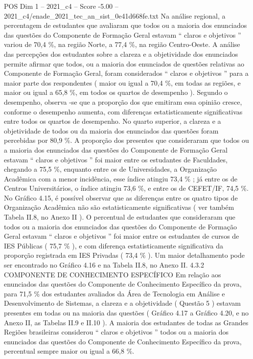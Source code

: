 \begin{textsample}{POS Dim 1 – 2021\_c4 – Score -5.00 – 2021\_c4/enade\_2021\_tec\_an\_sist\_0e41d668fe.txt}
Na análise regional, a percentagem de estudantes que avaliaram que todos ou a maioria dos enunciados das questões do Componente de Formação Geral estavam “ claros e objetivos ” variou de 70,4 \%, na região Norte, a 77,4 \%, na região Centro-Oeste.
A análise das percepções dos estudantes sobre a clareza e a objetividade dos enunciados permite afirmar que todos, ou a maioria dos enunciados de questões relativas ao Componente de Formação Geral, foram considerados “ claros e objetivos ” para a maior parte dos respondentes ( maior ou igual a 70,4 \%, em todas as regiões, e maior ou igual a 65,8 \%, em todos os quartos de desempenho ).
Segundo o desempenho, observa -se que a proporção dos que emitiram essa opinião cresce, conforme o desempenho aumenta, com diferenças estatisticamente significativas entre todos os quartos de desempenho.
No quarto superior, a clareza e a objetividade de todos ou da maioria dos enunciados das questões foram percebidas por 80,9 \%.
A proporção dos presentes que consideraram que todos ou a maioria dos enunciados das questões do Componente de Formação Geral estavam “ claros e objetivos ” foi maior entre os estudantes de Faculdades, chegando a 75,5 \%, enquanto entre os de Universidades, a Organização Acadêmica com a menor incidência, esse índice atingiu 73,4 \% ; já entre os de Centros Universitários, o índice atingiu 73,6 \%, e entre os de CEFET/IF, 74,5 \%.
No Gráfico 4.15, é possível observar que as diferenças entre os quatro tipos de Organização Acadêmica não são estatisticamente significativas ( ver também Tabela II.8, no Anexo II ).
O percentual de estudantes que consideraram que todos ou a maioria dos enunciados das questões do Componente de Formação Geral estavam “ claros e objetivos ” foi maior entre os estudantes de cursos de IES Públicas ( 75,7 \% ), e com diferença estatisticamente significativa da proporção registrada em IES Privadas ( 73,4 \% ).
Um maior detalhamento pode ser encontrado no Gráfico 4.16 e na Tabela II.8, no Anexo II. 4.3.2 COMPONENTE DE CONHECIMENTO ESPECÍFICO Em relação aos enunciados das questões do Componente de Conhecimento Específico da prova, para 71,5 \% dos estudantes avaliados da Área de Tecnologia em Análise e Desenvolvimento de Sistemas, a clareza e a objetividade ( Questão 5 ) estavam presentes em todas ou na maioria das questões ( Gráfico 4.17 a Gráfico 4.20, e no Anexo II, as Tabelas II.9 e II.10 ).
A maioria dos estudantes de todas as Grandes Regiões brasileiras considerou “ claros e objetivos ” todos ou a maioria dos enunciados das questões do Componente de Conhecimento Específico da prova, percentual sempre maior ou igual a 66,8 \%.

\end{textsample}
